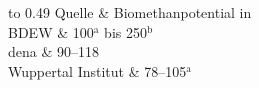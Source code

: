 {
\renewcommand{\arraystretch}{1.1}
\begin{table}[H]
	\begin{center}
		\caption{Biomethanpotential in Deutschland}
		\begin{tabu} to 0.49\textwidth {X X[1.2, r]}
			\hline
			Quelle             &	Biomethanpotential in \si{\twh}																\\ \hline
			BDEW \parencite{BDEW2019a}              	& 	\SI{100}{\relax}$^{\mathrm{a}}$ bis \SI{250}{\relax}$^{\mathrm{b}}$	\\
			dena \parencite{dena2017}              		& 	\SIrange{90}{118}{\relax}											\\
			Wuppertal Institut \parencite{WIKUE2006}	& 	\SIrange{78}{105}{\relax}$^{\mathrm{a}}$							\\ \hline
			 														\\
		\end{tabu}
		\label{tab:tab_methan-potential}
	\end{center}
\end{table}
}